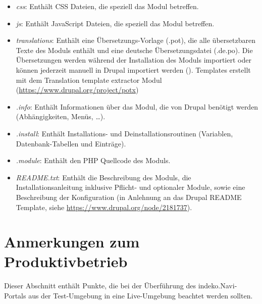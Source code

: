 \begin{itemize}
	\item \textit{css}: Enthält CSS Dateien, die speziell das Modul betreffen.

	\item \textit{js}: Enthält JavaScript Dateien, die speziell das Modul betreffen.

	\item \textit{translations}: Enthält eine Übersetzungs-Vorlage (.pot), die alle übersetzbaren Texte des Moduls enthält und eine deutsche Übersetzungsdatei (.de.po). Die Übersetzungen werden während der Installation des Moduls importiert oder können jederzeit manuell in Drupal importiert werden (). Templates erstellt mit dem Translation template extractor Modul (\url{https://www.drupal.org/project/potx})

	\item \textit{.info}: Enthält Informationen über das Modul, die von Drupal benötigt werden (Abhängigkeiten, Menüs, \dots).

	\item \textit{.install}: Enthält Installations- und Deinstallationsroutinen (Variablen, Datenbank-Tabellen und Einträge).

	\item \textit{.module}: Enthält den PHP Quellcode des Moduls.

	\item \textit{README.txt}: Enthält die Beschreibung des Moduls, die Installationsanleitung inklusive Pflicht- und optionaler Module, sowie eine Beschreibung der Konfiguration (in Anlehnung an das Drupal README Template, siehe \url{https://www.drupal.org/node/2181737}).
\end{itemize}




\section{Anmerkungen zum Produktivbetrieb}\label{sec:live}
Dieser Abschnitt enthält Punkte, die bei der Überführung des \acrshort{indeko}.Navi-Portals aus der Test-Umgebung in eine Live-Umgebung beachtet werden sollten.

